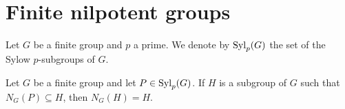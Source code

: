 %
%
%

\section{Finite nilpotent groups}

Let $G$ be a finite group and $p$ a prime. We denote by $\mathrm{Syl}_p(G)$ the set of the Sylow $p$-subgroups of $G$.

\begin{lemma}
	\label{lemma:N_G(H)=H}
	Let $G$ be a finite group and let $P\in\mathrm{Syl}_p(G)$. If $H$ is a subgroup of $G$
	such that $N_G(P)\subseteq H$, then $N_G(H)=H$.
\end{lemma}

